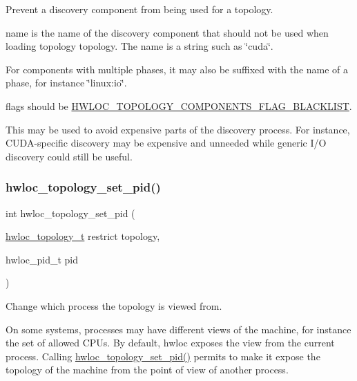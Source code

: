 Prevent a discovery component from being used for a topology. 

{\ttfamily name} is the name of the discovery component that should not be used when loading topology {\ttfamily topology}. The name is a string such as \char`\"{}cuda\char`\"{}.

For components with multiple phases, it may also be suffixed with the name of a phase, for instance \char`\"{}linux\+:io\char`\"{}.

{\ttfamily flags} should be \hyperlink{a00192_gga949f656c779208a36790feba24048b7ea33eec25d29253a2aba21dd3c731b416e}{H\+W\+L\+O\+C\+\_\+\+T\+O\+P\+O\+L\+O\+G\+Y\+\_\+\+C\+O\+M\+P\+O\+N\+E\+N\+T\+S\+\_\+\+F\+L\+A\+G\+\_\+\+B\+L\+A\+C\+K\+L\+I\+ST}.

This may be used to avoid expensive parts of the discovery process. For instance, C\+U\+D\+A-\/specific discovery may be expensive and unneeded while generic I/O discovery could still be useful. \mbox{\label{a00192_ga341fc17b5867a4715570baab131f68cd}} 
\subsubsection{\texorpdfstring{hwloc\+\_\+topology\+\_\+set\+\_\+pid()}{hwloc\_topology\_set\_pid()}}
{\footnotesize\ttfamily int hwloc\+\_\+topology\+\_\+set\+\_\+pid (\begin{DoxyParamCaption}\item[{\hyperlink{a00186_ga9d1e76ee15a7dee158b786c30b6a6e38}{hwloc\+\_\+topology\+\_\+t} restrict}]{topology,  }\item[{hwloc\+\_\+pid\+\_\+t}]{pid }\end{DoxyParamCaption})}



Change which process the topology is viewed from. 

On some systems, processes may have different views of the machine, for instance the set of allowed C\+P\+Us. By default, hwloc exposes the view from the current process. Calling \hyperlink{a00192_ga341fc17b5867a4715570baab131f68cd}{hwloc\+\_\+topology\+\_\+set\+\_\+pid()} permits to make it expose the topology of the machine from the point of view of another process.

